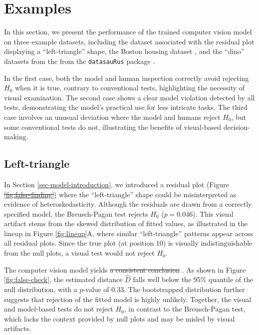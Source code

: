 \documentclass[]{interact}
\theoremstyle{plain}%
\theoremstyle{definition}
\theoremstyle{remark}
\providecommand{\DIFaddtex}[1]{{\protect\color{blue}\uwave{#1}}} %
\providecommand{\DIFdeltex}[1]{{\protect\color{red}\sout{#1}}}                      %
\providecommand{\DIFaddbegin}{} %
\providecommand{\DIFaddend}{} %
\providecommand{\DIFdelbegin}{} %
\providecommand{\DIFdelend}{} %
\providecommand{\DIFadd}[1]{\texorpdfstring{\DIFaddtex{#1}}{#1}} %
\providecommand{\DIFdel}[1]{\texorpdfstring{\DIFdeltex{#1}}{}} %
\begin{document}
\section{Examples}\label{sec-examples}

In this section, we present the performance of the trained computer
vision model on three example datasets, including the dataset associated
with the residual plot displaying a ``left-triangle'' shape, the Boston
housing dataset \citep{harrison1978hedonic}, and the ``dino'' datasets
from the from the \texttt{datasauRus} package \citep{datasaurus}.

In the first case, both the model and human inspection correctly avoid
rejecting \(H_0\) when it is true, contrary to conventional tests,
highlighting the necessity of visual examination. The second case shows
a clear model violation detected by all tests, demonstrating the model's
practical use for less intricate tasks. The third case involves an
unusual deviation where the model and humans reject \(H_0\), but some
conventional tests do not, illustrating the benefits of visual-based
decision-making.

\subsection{Left-triangle}\label{left-triangle}

In Section \ref{sec-model-introduction}, we introduced a residual plot
(Figure \DIFdelbegin \DIFdel{\ref{fig:false-finding}}\DIFdelend \DIFaddbegin \DIFadd{\ref{fig:false-check}A}\DIFaddend ) where the ``left-triangle'' shape could
be misinterpreted as evidence of heteroskedasticity. Although the
residuals are drawn from a correctly specified model, the Breusch-Pagan
test rejects \(H_0\) (\(p = 0.046\)). This visual artifact stems from
the skewed distribution of fitted values, as \DIFaddbegin \DIFadd{later }\DIFaddend illustrated in the
lineup in Figure \ref{fig:lineup}A, where similar ``left-triangle''
patterns appear across all residual plots. Since the true plot (at
position 10) is visually indistinguishable from the null plots, a visual
test would not reject \(H_0\).

The computer vision model yields \DIFdelbegin \DIFdel{a consistent conclusion }\DIFdelend \DIFaddbegin \DIFadd{the same conclusion from the lineup}\DIFaddend . As
shown in Figure \ref{fig:false-check}\DIFaddbegin \DIFadd{C}\DIFaddend , the estimated distance
\(\hat{D}\) falls well below the 95\% quantile of the null distribution,
with a \(p\)-value of \(0.33\). The bootstrapped distribution further
suggests that rejection of the fitted model is highly unlikely.
Together, the visual and model-based tests do not reject \(H_0\), in
contrast to the Breusch-Pagan test, which lacks the context provided by
null plots and may be misled by visual artifacts.
\end{document}
